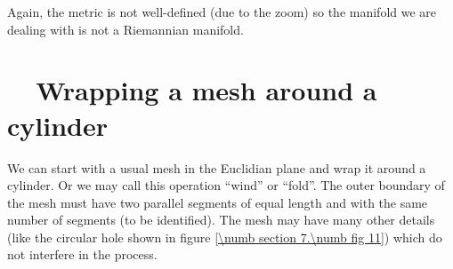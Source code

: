 Again, the metric is not well-defined (due to the zoom)
so the manifold we are dealing with is not a Riemannian manifold.


\section{~~Wrapping a mesh around a cylinder}\label{\numb section 7.\numb parag 16}

We can start with a usual mesh in the Euclidian plane and wrap it around a cylinder.
Or we may call this operation ``wind'' or ``fold''.
The outer boundary of the mesh must have two parallel segments of equal length and with
the same number of segments (to be identified).
The mesh may have many other details (like the circular hole shown in figure
\ref{\numb section 7.\numb fig 11}) which do not interfere in the process.

